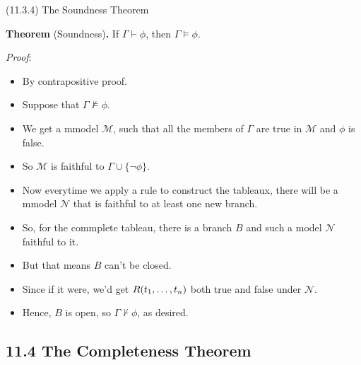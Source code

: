 \begin{frame}{(11.3.4) The Soundness Theorem}

\textbf{Theorem} (Soundness)\textbf{.} If $\Gamma\vdash\phi$, then
$\Gamma\vDash\phi$.

\emph{Proof}:

\begin{itemize}
\item By contrapositive proof.
\item Suppose that $\Gamma\nvDash\phi$.
  \item We get a mmodel $\mathcal{M}$, such that all the members of
    $\Gamma$ are true in $\mathcal{M}$ and $\phi$ is false.
  \item So $\mathcal{M}$ is faithful to $\Gamma\cup\{\neg\phi\}$.
    \item Now everytime we apply a rule to construct the tableaux,
      there will be a mmodel $\mathcal{N}$ that is faithful to at
      least one new branch.
      \item So, for the commplete tableau, there is a branch $B$ and
        such a model 
        $\mathcal{N}$ faithful to it.

      \item But that means $B$ can't be closed.
        \item Since if it were, we'd get $R(t_1, \mathellipsis, t_n)$
          both true and false under $\mathcal{N}$.
          \item Hence, $B$ is open, so $\Gamma\nvdash\phi$, as desired.
\end{itemize}
  
\end{frame}

\subsection{11.4 The Completeness Theorem}

